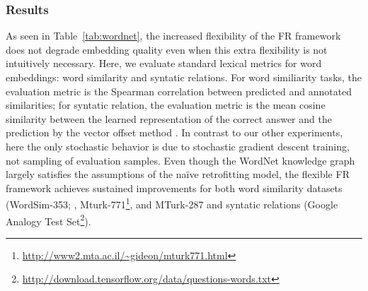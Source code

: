 \documentclass[11pt, a4paper]{article}
\begin{document}
\subsubsection*{Results}
As seen in Table~\ref{tab:wordnet}, the increased flexibility of the FR framework does not degrade embedding quality even when this extra flexibility is not intuitively necessary. Here, we evaluate standard lexical metrics for word embeddings: word similarity and syntatic relations. For word similiarity tasks, the evaluation metric is the Spearman correlation between predicted and annotated similarities; for syntatic relation, the evaluation metric is the mean cosine similarity between the learned representation of the correct answer and the prediction by the vector offset method \cite{mikolov2013linguistic}. In contrast to our other experiments, here the only stochastic behavior is due to stochastic gradient descent training, not sampling of evaluation samples. Even though the WordNet knowledge graph largely satisfies the assumptions of the na{\"i}ve retrofitting model, the flexible FR framework achieves sustained improvements for both word similarity datasets (WordSim-353; , Mturk-771\footnote{\url{http://www2.mta.ac.il/~gideon/mturk771.html}}, and MTurk-287%
and syntatic relations (Google Analogy Test Set\footnote{\url{http://download.tensorflow.org/data/questions-words.txt}}).
\end{document}
